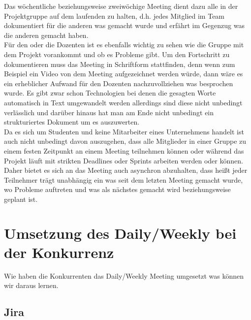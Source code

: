 Das wöchentliche beziehungsweise zweiwöchige Meeting dient dazu alle in der Projektgruppe auf dem laufenden zu halten, d.h. jedes Mitglied im Team dokumentiert für die anderen was gemacht wurde und erfährt im Gegenzug was die anderen gemacht haben.\\
Für den oder die Dozenten ist es ebenfalls wichtig zu sehen wie die Gruppe mit dem Projekt vorankommt und ob es Probleme gibt. Um den Fortschritt zu dokumentieren muss das Meeting in Schriftform stattfinden, denn wenn zum Beispiel ein Video von dem Meeting aufgezeichnet werden würde, dann wäre es ein erheblicher Aufwand für den Dozenten nachzuvollziehen was besprochen wurde. Es gibt zwar schon Technologien bei denen die gesagten Worte automatisch in Text umgewandelt werden allerdings sind diese nicht unbedingt verlässlich und darüber hinaus hat man am Ende nicht unbedingt ein strukturiertes Dokument um es auszuwerten.\\
Da es sich um Studenten und keine Mitarbeiter eines Unternehmens handelt ist auch nicht unbedingt davon auszugehen, dass alle Mitglieder in einer Gruppe zu einem festen Zeitpunkt an einem Meeting teilnehmen können oder während das Projekt läuft mit strikten Deadlines oder Sprints arbeiten werden oder können. Daher bietet es sich an das Meeting auch asynchron abzuhalten, dass heißt jeder Teilnehmer trägt unabhängig ein was seit dem letzten Meeting gemacht wurde, wo Probleme auftreten und was als nächstes gemacht wird beziehungsweise geplant ist. 

\section{Umsetzung des Daily/Weekly bei der Konkurrenz}

Wie haben die Konkurrenten das Daily/Weekly Meeting umgesetzt was können wir daraus lernen.

\subsection{Jira}

